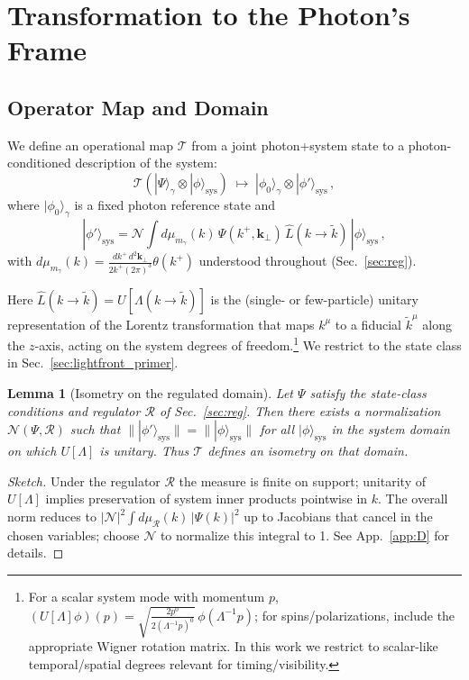 \documentclass[aps,11pt]{article}
\providecommand{\ket}[1]{|#1\rangle}
\newcommand{\kplus}{k^{+}}
\newcommand{\kperp}{\mathbf{k}_{\perp}}
\newtheorem{lem}{Lemma}
\begin{document}
\section{Transformation to the Photon’s Frame}\label{sec:framework}

\subsection{Operator Map and Domain}\label{sec:map}
We define an operational map \(\mathcal{T}\) from a joint photon+system state to a photon-conditioned description of the system:
\begin{equation}\label{T_map}
\mathcal{T}\!\left(\ket{\Psi}_{\gamma}\otimes\ket{\phi}_{\mathrm{sys}}\right)
\;\mapsto\; \ket{\phi_{0}}_{\gamma}\otimes \ket{\phi'}_{\mathrm{sys}}\,,
\end{equation}
where \(\ket{\phi_{0}}_{\gamma}\) is a fixed photon reference state and
\begin{equation}\label{phi_prime}
\ket{\phi'}_{\mathrm{sys}} = \mathcal{N}\!\int d\mu_{m_\gamma}(k)\,
\Psi(\kplus,\kperp)\, \hat{L}(k\!\to\!\tilde k)\,\ket{\phi}_{\mathrm{sys}}\,,
\end{equation}
with \(d\mu_{m_\gamma}(k)=\frac{d\kplus\, d^{2}\kperp}{2\kplus(2\pi)^3}\theta(\kplus)\) understood throughout (Sec.~\ref{sec:reg}).

Here \(\hat{L}(k\!\to\!\tilde k)=U[\Lambda(k\to \tilde k)]\) is the (single- or few-particle) unitary representation of the Lorentz transformation that maps \(k^\mu\) to a fiducial \(\tilde k^\mu\) along the \(z\)-axis, acting on the system degrees of freedom.\footnote{For a scalar system mode with momentum \(p\), \((U[\Lambda]\phi)(p)=\sqrt{\frac{2p^0}{2(\Lambda^{-1}p)^0}}\,\phi(\Lambda^{-1}p)\); for spins/polarizations, include the appropriate Wigner rotation matrix. In this work we restrict to scalar-like temporal/spatial degrees relevant for timing/visibility.}
We restrict to the state class in Sec.~\ref{sec:lightfront_primer}.

\begin{lem}[Isometry on the regulated domain]\label{lem:isometry}
Let \(\Psi\) satisfy the state-class conditions and regulator \(\mathcal{R}\) of Sec.~\ref{sec:reg}. Then there exists a normalization \(\mathcal N(\Psi,\mathcal R)\) such that \(\|\ket{\phi'}_{\mathrm{sys}}\|=\|\ket{\phi}_{\mathrm{sys}}\|\) for all \(\ket{\phi}_{\mathrm{sys}}\) in the system domain on which \(U[\Lambda]\) is unitary. Thus \(\mathcal{T}\) defines an isometry on that domain.
\end{lem}
\begin{proof}[Sketch]
Under the regulator \(\mathcal R\) the measure is finite on support; unitarity of \(U[\Lambda]\) implies preservation of system inner products pointwise in \(k\). The overall norm reduces to \(|\mathcal N|^2\int d\mu_{\mathcal R}(k)\,|\Psi(k)|^2\) up to Jacobians that cancel in the chosen variables; choose \(\mathcal N\) to normalize this integral to 1. See App.~\ref{app:D} for details.
\end{proof}
\end{document}
